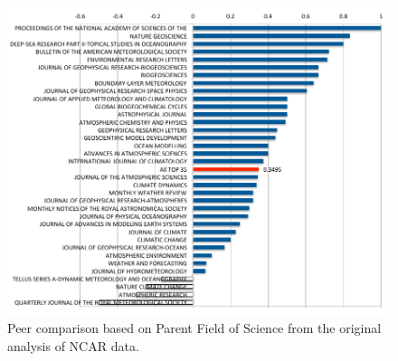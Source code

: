 \documentclass[10pt, conference, compsocconf]{IEEEtran}
\begin{document}
\begin{figure}[h!]
  \centering 
    \includegraphics[width=1.0\columnwidth]{images-new/ncar-c.pdf} 
\vspace{-18pt}
  \caption{Peer comparison based on Parent Field of Science from the original analysis of NCAR data.}\label{F:ncar-score}
\end{figure} 
\end{document}
